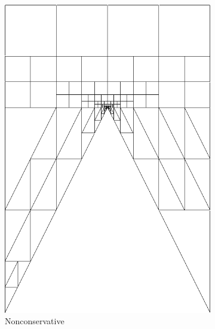 \documentclass[letterpaper]{article}
\begin{document}
\begin{figure}[p]
\begin{subfigure}[t]{0.4\textwidth}
\includegraphics[width=\textwidth]{figs/Wedge/modified16nc_mesh.png}
\caption{Nonconservative}
\label{fig:wedgeGraph16nc}
\end{subfigure}
\begin{subfigure}[t]{0.4\textwidth}
\centering

\end{subfigure}
\end{figure}
\end{document}
